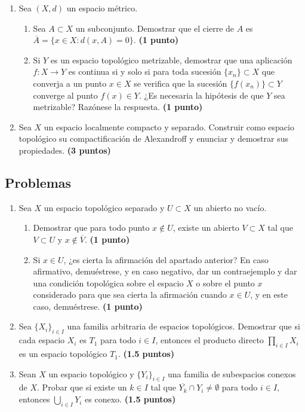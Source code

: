 \begin{enumerate}
    \item Sea $(X, d)$ un espacio métrico.
    \begin{enumerate}
        \item Sea $A \subset X$ un subconjunto. Demostrar que el cierre de $A$ es $\overline{A} = \{x \in X : d(x, A) = 0\}$.
        \hfill \textbf{(1 punto)}
        \item Si $Y$ es un espacio topológico metrizable, demostrar que una aplicación $f : X \to Y$ es continua si y solo si para toda sucesión $\{x_n\} \subset X$ que converja a un punto $x \in X$ se verifica que la sucesión $\{f(x_n)\} \subset Y$ converge al punto $f(x) \in Y$. ¿Es necesaria la hipótesis de que $Y$ sea metrizable? Razónese la respuesta.
        \hfill \textbf{(1 punto)}
    \end{enumerate}

    \item Sea $X$ un espacio localmente compacto y separado. Construir como espacio topológico su compactificación de Alexandroff y enunciar y demostrar sus propiedades.
    \hfill \textbf{(3 puntos)}
\end{enumerate}

\subsection{Problemas}

\begin{enumerate}
    \item Sea $X$ un espacio topológico separado y $U \subset X$ un abierto no vacío.
    \begin{enumerate}
        \item Demostrar que para todo punto $x \notin U$, existe un abierto $V \subset X$ tal que $V \subset U$ y $x \notin \overline{V}$.
        \hfill \textbf{(1 punto)}
        \item Si $x \in U$, ¿es cierta la afirmación del apartado anterior? En caso afirmativo, demuéstrese, y en caso negativo, dar un contraejemplo y dar una condición topológica sobre el espacio $X$ o sobre el punto $x$ considerado para que sea cierta la afirmación cuando $x \in U$, y en este caso, demuéstrese.
        \hfill \textbf{(1 punto)}
    \end{enumerate}

    \item Sea $\{X_i\}_{i \in I}$ una familia arbitraria de espacios topológicos. Demostrar que si cada espacio $X_i$ es $T_1$ para todo $i \in I$, entonces el producto directo $\prod_{i \in I} X_i$ es un espacio topológico $T_1$.
    \hfill \textbf{(1.5 puntos)}

    \item Sean $X$ un espacio topológico y $\{Y_i\}_{i \in I}$ una familia de subespacios conexos de $X$. Probar que si existe un $k \in I$ tal que $\overline{Y_k} \cap Y_i \neq \emptyset$ para todo $i \in I$, entonces $\bigcup_{i \in I} Y_i$ es conexo.
    \hfill \textbf{(1.5 puntos)}
\end{enumerate}

